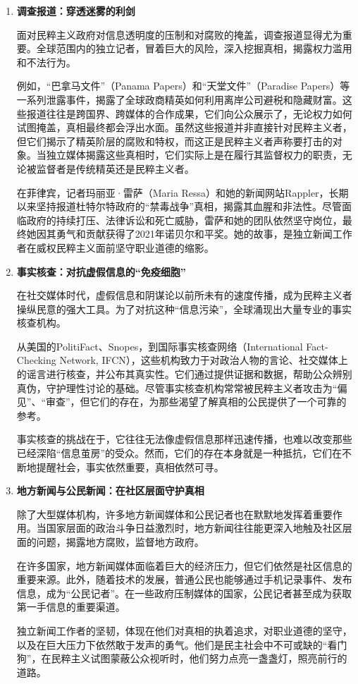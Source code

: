 \begin{enumerate}
    \item \textbf{调查报道：穿透迷雾的利剑}

    面对民粹主义政府对信息透明度的压制和对腐败的掩盖，调查报道显得尤为重要。全球范围内的独立记者，冒着巨大的风险，深入挖掘真相，揭露权力滥用和不法行为。

    例如，“巴拿马文件”（Panama Papers）和“天堂文件”（Paradise Papers）等一系列泄露事件，揭露了全球政商精英如何利用离岸公司避税和隐藏财富。这些报道往往是跨国界、跨媒体的合作成果，它们向公众展示了，无论权力如何试图掩盖，真相最终都会浮出水面。虽然这些报道并非直接针对民粹主义者，但它们揭示了精英阶层的腐败和特权，而这正是民粹主义者声称要打击的对象。当独立媒体揭露这些真相时，它们实际上是在履行其监督权力的职责，无论被监督者是传统精英还是民粹主义者。

    在菲律宾，记者玛丽亚·雷萨（Maria Ressa）和她的新闻网站Rappler，长期以来坚持报道杜特尔特政府的“禁毒战争”真相，揭露其血腥和非法性。尽管面临政府的持续打压、法律诉讼和死亡威胁，雷萨和她的团队依然坚守岗位，最终她因其勇气和贡献获得了2021年诺贝尔和平奖。她的故事，是独立新闻工作者在威权民粹主义面前坚守职业道德的缩影。

    \item \textbf{事实核查：对抗虚假信息的“免疫细胞”}

    在社交媒体时代，虚假信息和阴谋论以前所未有的速度传播，成为民粹主义者操纵民意的强大工具。为了对抗这种“信息污染”，全球涌现出大量专业的事实核查机构。

    从美国的PolitiFact、Snopes，到国际事实核查网络（International Fact-Checking Network, IFCN），这些机构致力于对政治人物的言论、社交媒体上的谣言进行核查，并公布其真实性。它们通过提供证据和数据，帮助公众辨别真伪，守护理性讨论的基础。尽管事实核查机构常常被民粹主义者攻击为“偏见”、“审查”，但它们的存在，为那些渴望了解真相的公民提供了一个可靠的参考。

    事实核查的挑战在于，它往往无法像虚假信息那样迅速传播，也难以改变那些已经深陷“信息茧房”的受众。然而，它们的存在本身就是一种抵抗，它们在不断地提醒社会，事实依然重要，真相依然可寻。

    \item \textbf{地方新闻与公民新闻：在社区层面守护真相}

    除了大型媒体机构，许多地方新闻媒体和公民记者也在默默地发挥着重要作用。当国家层面的政治斗争日益激烈时，地方新闻往往能更深入地触及社区层面的问题，揭露地方腐败，监督地方政府。

    在许多国家，地方新闻媒体面临着巨大的经济压力，但它们依然是社区信息的重要来源。此外，随着技术的发展，普通公民也能够通过手机记录事件、发布信息，成为“公民记者”。在一些政府压制媒体的国家，公民记者甚至成为获取第一手信息的重要渠道。

    独立新闻工作者的坚韧，体现在他们对真相的执着追求，对职业道德的坚守，以及在巨大压力下依然敢于发声的勇气。他们是民主社会中不可或缺的“看门狗”，在民粹主义试图蒙蔽公众视听时，他们努力点亮一盏盏灯，照亮前行的道路。
\end{enumerate}

